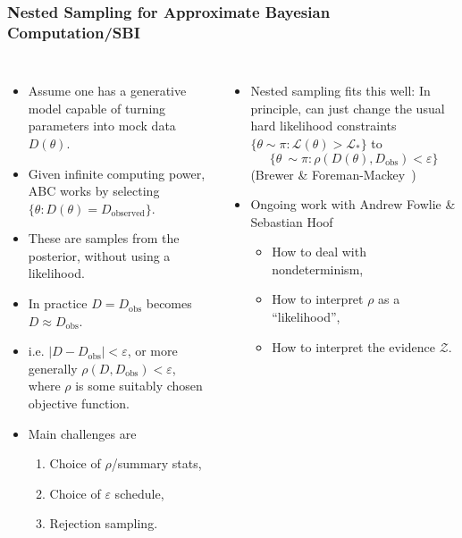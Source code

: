 \documentclass[aspectratio=169]{beamer}
\begin{document}
\begin{frame}
    \frametitle{Nested Sampling for Approximate Bayesian Computation/SBI}
    \begin{columns}
        \begin{itemize}
            \item Assume one has a generative model capable of turning parameters into mock data $D(\theta)$.
            \item Given infinite computing power, ABC works by selecting $\{\theta : D(\theta)=D_\mathrm{observed}\}$.
            \item These are samples from the posterior, without using a likelihood.
            \item In practice $D=D_\mathrm{obs}$ becomes $D\approx D_\mathrm{obs}$.
            \item i.e. $|D-D_\mathrm{obs}|<\varepsilon$, or more generally $\boxed{\rho(D,D_\mathrm{obs})<\varepsilon}$, where $\rho$ is some suitably chosen objective function.
            \item Main challenges are 
                \begin{enumerate}
                    \item Choice of $\rho$/summary stats,
                    \item Choice of $\varepsilon$ schedule,
                    \item Rejection sampling.
                \end{enumerate}
        \end{itemize}
        \begin{itemize}
            \item Nested sampling fits this well: In principle, can just change the usual hard likelihood constraints $\{\theta\sim\pi : \mathcal{L}(\theta)>\mathcal{L}_*\}$ to
                \[\{\theta~\sim\pi : \rho(D(\theta),D_\mathrm{obs})<\varepsilon\}\]
            (Brewer \& Foreman-Mackey~)
            \item Ongoing work with Andrew Fowlie \& Sebastian Hoof
                \begin{itemize}
                    \item How to deal with nondeterminism,
                    \item How to interpret $\rho$ as a ``likelihood'',
                    \item How to interpret the evidence $\mathcal{Z}$.
                \end{itemize}
        \end{itemize}
    \end{columns}
\end{frame}
\end{document}
